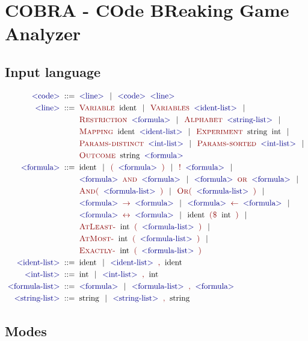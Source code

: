 \chapter{COBRA - COde BReaking Game Analyzer}
\label{ch:cobra}

\section{Input language}

\newcommand{\symb}[1]{\;\textcolor{DarkBlue}{\textrm{$<$#1$>$}}\;}
\newcommand{\txt}[1]{\;\textcolor{DarkRed}{\textsc{#1}}\;}
\newcommand{\term}[1]{\;\textrm{#1}\;}
\begin{align*}
\symb{code} ::=\;& \symb{line} \| \symb{code} \symb{line}\\
\symb{line} ::=\;& \txt{Variable} \term{ident} \| \txt{Variables} \symb{ident-list} \| \\
  & \txt{Restriction} \symb{formula} \| \txt{Alphabet} \symb{string-list} \| \\
  & \txt{Mapping} \term{ident} \symb{ident-list} \| \txt{Experiment} \term{string} \term{int} \| \\
  & \txt{Params-distinct} \symb{int-list} \| \txt{Params-sorted} \symb{int-list} \| \\
  & \txt{Outcome} \term{string} \symb{formula} \\
\symb{formula} ::=\;&  \term{ident} \| \txt{(} \symb{formula} \txt{)} \| \txt{!} \symb{formula} \| \\
 & \symb{formula} \txt{and} \symb{formula} \| \symb{formula} \txt{or} \symb{formula} \| \\
 & \txt{And(} \symb{formula-list} \txt{)} \| \txt{Or(} \symb{formula-list} \txt{)} \| \\
 & \symb{formula} \txt{$\rightarrow$} \symb{formula} \| \symb{formula} \txt{$\leftarrow$} \symb{formula} \| \\
 & \symb{formula} \txt{$\leftrightarrow$} \symb{formula} \| \term{ident} \txt{(\$} \term{int} \txt{)} \| \\
 & \txt{AtLeast-} \term{int} \txt{(} \symb{formula-list} \txt{)} \| \\
 & \txt{AtMost-} \term{int} \txt{(} \symb{formula-list} \txt{)} \| \\
 & \txt{Exactly-} \term{int} \txt{(} \symb{formula-list} \txt{)} \\
\symb{ident-list} ::=\;& \term{ident} \| \symb{ident-list} \txt{,} \term{ident} \\
\symb{int-list} ::=\;& \term{int} \| \symb{int-list} \txt{,} \term{int} \\
\symb{formula-list} ::=\;& \symb{formula} \| \symb{formula-list} \txt{,} \symb{formula} \\
\symb{string-list} ::=\;& \term{string} \| \symb{string-list} \txt{,} \term{string}
\end{align*}

\section{Modes}
